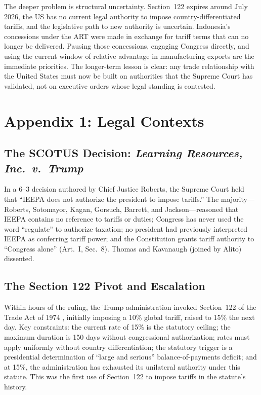 \documentclass[12pt,a4paper]{article}
\begin{document}
The deeper problem is structural uncertainty. Section~122 expires around July 2026, the US has no current legal authority to impose country-differentiated tariffs, and the legislative path to new authority is uncertain. Indonesia's concessions under the ART were made in exchange for tariff terms that can no longer be delivered. Pausing those concessions, engaging Congress directly, and using the current window of relative advantage in manufacturing exports are the immediate priorities. The longer-term lesson is clear: any trade relationship with the United States must now be built on authorities that the Supreme Court has validated, not on executive orders whose legal standing is contested.

\section*{Appendix 1: Legal Contexts}

\subsection*{The SCOTUS Decision: \textit{Learning Resources, Inc.\ v.\ Trump}}

In a 6--3 decision authored by Chief Justice Roberts, the Supreme Court held that ``IEEPA does not authorize the president to impose tariffs.'' The majority---Roberts, Sotomayor, Kagan, Gorsuch, Barrett, and Jackson---reasoned that IEEPA contains no reference to tariffs or duties; Congress has never used the word ``regulate'' to authorize taxation; no president had previously interpreted IEEPA as conferring tariff power; and the Constitution grants tariff authority to ``Congress alone'' (Art.\ I, Sec.\ 8). Thomas and Kavanaugh (joined by Alito) dissented.

\subsection*{The Section 122 Pivot and Escalation}

Within hours of the ruling, the Trump administration invoked Section~122 of the Trade Act of 1974 \cite{s122_statute,crs_122}, initially imposing a 10\% global tariff, raised to 15\% the next day. Key constraints: the current rate of 15\% is the statutory ceiling; the maximum duration is 150 days without congressional authorization; rates must apply uniformly without country differentiation; the statutory trigger is a presidential determination of ``large and serious'' balance-of-payments deficit; and at 15\%, the administration has exhausted its unilateral authority under this statute. This was the first use of Section~122 to impose tariffs in the statute's history.
\end{document}
